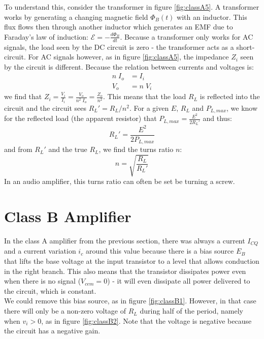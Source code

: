 To understand this, consider the transformer in figure \ref{fig:classA5}. A transformer works by generating a changing magnetic field $\Phi_B(t)$ with an inductor. This flux flows then through another inductor which generates an EMF due to Faraday's law of induction: $\mathcal{E} = -\frac{d\Phi_B}{dt}$. Because a transformer only works for AC signals, the load seen by the DC circuit is zero - the transformer acts as a short-circuit. For AC signals however, as in figure \ref{fig:classA5}, the impedance $Z_i$ seen by the circuit is different. Because the relation between currents and voltages is:
\begin{align*}
	n \; I_o &= I_i \\
	V_o &= n \; V_i
\end{align*}
we find that $Z_i = \frac{V_i}{I_i} = \frac{V_o}{n^2 \; I_o} = \frac{Z_o}{n^2}$. This means that the load $R_L$ is reflected into the circuit and the circuit sees $R_L' = R_L/n^2$. For a given $E$, $R_L$ and $P_{L, max}$, we know for the reflected load (the apparent resistor) that $P_{L, max} = \frac{E^2}{2R_L'}$ and thus:
$$
R_L' = \frac{E^2}{2P_{L, max}}
$$
and from $R_L'$ and the true $R_L$, we find the turns ratio $n$:
$$
n = \sqrt{\frac{R_L}{R_L'}}
$$
In an audio amplifier, this turns ratio can often be set be turning a screw.
\section{Class B Amplifier}
\label{sec:classB}
In the class A amplifier from the previous section, there was always a current $I_{CQ}$ and a current variation $i_c$ around this value because there is a bias source $E_B$ that lifts the base voltage at the input transistor to a level that allows conduction in the right branch. This also means that the transistor dissipates power even when there is no signal ($V_{cem} = 0$) - it will even dissipate all power delivered to the circuit, which is constant.\\
We could remove this bias source, as in figure \ref{fig:classB1}. However, in that case there will only be a non-zero voltage of $R_L$ during half of the period, namely when $v_i > 0$, as in figure \ref{fig:classB2}. Note that the voltage is negative because the circuit has a negative gain.\\

